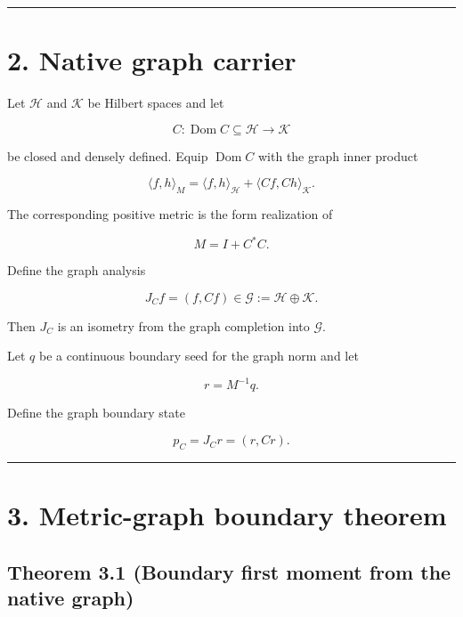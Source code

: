 \begin{center}\rule{0.5\linewidth}{0.5pt}\end{center}

\hypertarget{native-graph-carrier}{%
\section{2. Native graph carrier}\label{native-graph-carrier}}

Let \(\mathcal H\) and \(\mathcal K\) be Hilbert spaces and let

\[
C:\operatorname{Dom}C\subseteq\mathcal H\to\mathcal K
\]

be closed and densely defined. Equip \(\operatorname{Dom}C\) with the graph
inner product

\[
\langle f,h\rangle_M
=
\langle f,h\rangle_{\mathcal H}
+
\langle Cf,Ch\rangle_{\mathcal K}.
\]

The corresponding positive metric is the form realization of

\[
M=I+C^*C.
\]

Define the graph analysis

\[
\boxed{
J_Cf=(f,Cf)
\in\mathcal G:=\mathcal H\oplus\mathcal K.
}
\]

Then \(J_C\) is an isometry from the graph completion into \(\mathcal G\).

Let \(q\) be a continuous boundary seed for the graph norm and let

\[
\boxed{
r=M^{-1}q.}
\]

Define the graph boundary state

\[
\boxed{
p_C=J_Cr=(r,Cr).}
\]

\begin{center}\rule{0.5\linewidth}{0.5pt}\end{center}

\hypertarget{metric-graph-boundary-theorem}{%
\section{3. Metric-graph boundary theorem}\label{metric-graph-boundary-theorem}}

\hypertarget{theorem-3.1-boundary-first-moment-from-the-native-graph}{%
\subsection{Theorem 3.1 (Boundary first moment from the native graph)}\label{theorem-3.1-boundary-first-moment-from-the-native-graph}}

